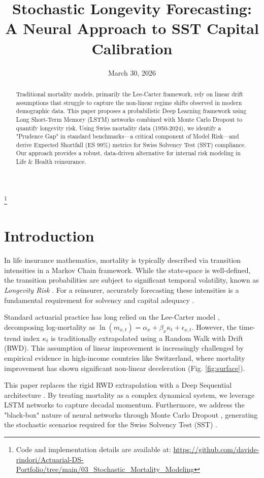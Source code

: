 \documentclass[11pt,a4paper]{article}
\title{\textbf{Stochastic Longevity Forecasting: A Neural Approach to SST Capital Calibration}}
\date{March 30, 2026}
\newcommand{\lnmx}{\ln(m_{x,t})}
\newcommand{\kt}{\kappa_t}
\begin{document}
\maketitle

\begin{abstract}
Traditional mortality models, primarily the Lee-Carter framework, rely on linear drift assumptions that struggle to capture the non-linear regime shifts observed in modern demographic data. This paper proposes a probabilistic Deep Learning framework using Long Short-Term Memory (LSTM) networks combined with Monte Carlo Dropout to quantify longevity risk. Using Swiss mortality data (1950-2024), we identify a "Prudence Gap" in standard benchmarks—a critical component of Model Risk—and derive Expected Shortfall (ES 99\%) metrics for Swiss Solvency Test (SST) compliance. Our approach provides a robust, data-driven alternative for internal risk modeling in Life \& Health reinsurance.
\end{abstract}

\let\thefootnote\relax\footnote{Code and implementation details are available at: \url{https://github.com/davide-rindori/Actuarial-DS-Portfolio/tree/main/03_Stochastic_Mortality_Modeling}}

\section{Introduction}
In life insurance mathematics, mortality is typically described via transition intensities in a Markov Chain framework. While the state-space is well-defined, the transition probabilities are subject to significant temporal volatility, known as \textit{Longevity Risk} \cite{cairns2006two}. For a reinsurer, accurately forecasting these intensities is a fundamental requirement for solvency and capital adequacy \cite{wuthrich2023statistical}.

Standard actuarial practice has long relied on the Lee-Carter model \cite{lee1992modeling}, decomposing log-mortality as $\lnmx = \alpha_x + \beta_x \kt + \epsilon_{x,t}$. However, the time-trend index $\kt$ is traditionally extrapolated using a Random Walk with Drift (RWD). This assumption of linear improvement is increasingly challenged by empirical evidence in high-income countries like Switzerland, where mortality improvement has shown significant non-linear deceleration (Fig. \ref{fig:surface}).

This paper replaces the rigid RWD extrapolation with a Deep Sequential architecture \cite{richman2019lee, perla2021time}. By treating mortality as a complex dynamical system, we leverage LSTM networks to capture decadal momentum. Furthermore, we address the "black-box" nature of neural networks through Monte Carlo Dropout \cite{gal2016dropout}, generating the stochastic scenarios required for the Swiss Solvency Test (SST) \cite{finma2024sst}.
\end{document}
